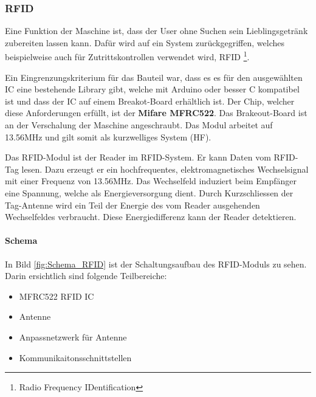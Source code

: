\subsubsection{RFID}
\label{subsubsec:RFID}

Eine Funktion der Maschine ist, dass der User ohne Suchen sein Lieblingsgetränk zubereiten lassen kann. Dafür wird auf ein System zurückgegriffen, welches beispielweise auch für Zutrittskontrollen verwendet wird, RFID \footnote{Radio Frequency IDentification}.

Ein Eingrenzungskriterium für das Bauteil war, dass es es für den ausgewählten IC eine bestehende Library gibt, welche mit Arduino oder besser C kompatibel ist und dass der IC auf einem Breakot-Board erhältlich ist. Der Chip, welcher diese Anforderungen erfüllt, ist der \textbf{Mifare MFRC522}. Das Brakeout-Board ist an der Verschalung der Maschine angeschraubt.
Das Modul arbeitet auf 13.56MHz und gilt somit als kurzwelliges System (HF). \cite{nxp_semiconductors_nv_mfrc522_2017}

Das RFID-Modul ist der Reader im RFID-System. Er kann Daten vom RFID-Tag lesen. Dazu erzeugt er ein hochfrequentes, elektromagnetisches Wechselsignal mit einer Frequenz von 13.56MHz. Das Wechselfeld induziert beim Empfänger eine Spannung, welche als Energieversorgung dient. Durch Kurzschliessen der Tag-Antenne wird ein Teil der Energie des vom Reader ausgehenden Wechselfeldes verbraucht. Diese Energiedifferenz kann der Reader detektieren.


\paragraph{Schema}\mbox{}

In Bild \ref{fig:Schema_RFID} ist der Schaltungsaufbau des RFID-Moduls zu sehen. Darin ersichtlich sind folgende Teilbereiche:

\begin{itemize}
\item MFRC522 RFID IC
\item Antenne
\item Anpassnetzwerk für Antenne
\item Kommunikaitonsschnittstellen
\end{itemize}

